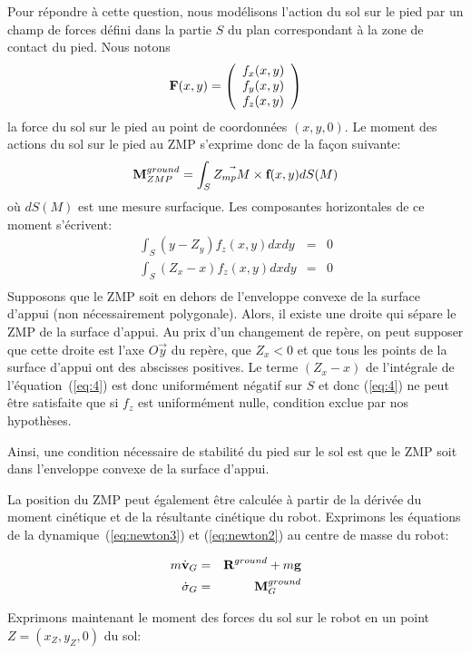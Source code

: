 Pour répondre à cette question, nous modélisons l'action du sol sur le
pied par un champ de forces défini dans la partie $S$ du plan
correspondant à la zone de contact du pied. Nous notons
$$
\textbf{F}(x,y) = \left(\begin{array}{c}
f_x(x,y) \\ f_y(x,y) \\ f_z(x,y)
\end{array}\right)
$$
la force du sol sur le pied au point de coordonnées $(x,y,0)$. Le
moment des actions du sol sur le pied au ZMP s'exprime donc de la
façon suivante:
\begin{eqnarray*}
\textbf{M}^{ground}_{ZMP} = \int_S \vec{Z_{mp}M} \times \textbf{f}(x,y) dS(M)
\end{eqnarray*}
où $dS(M)$ est une mesure surfacique.
Les composantes horizontales de ce moment s'écrivent:
\begin{eqnarray}\label{eq:3}
  \int_S (y-Z_y)f_z(x,y) dx dy &=& 0 \\
  \label{eq:4}
  \int_S (Z_x-x)f_z(x,y) dx dy &=& 0 \\
\end{eqnarray}
Supposons que le ZMP soit en dehors de l'enveloppe convexe de la
surface d'appui (non nécessairement polygonale). Alors, il existe une
droite qui sépare le ZMP de la surface d'appui. Au prix d'un
changement de repère, on peut supposer que cette droite est l'axe
$O\vec{y}$ du repère, que $Z_x < 0$ et que tous les points de la
surface d'appui ont des abscisses positives. Le terme $(Z_x-x)$ de
l'intégrale de l'équation (\ref{eq:4}) est donc uniformément négatif
sur $S$ et donc (\ref{eq:4}) ne peut être satisfaite que si $f_z$ est
uniformément nulle, condition exclue par nos hypothèses.

Ainsi, une condition nécessaire de stabilité du pied sur le sol est
que le ZMP soit dans l'enveloppe convexe de la surface d'appui.


La position du ZMP peut également être calculée à partir de la dérivée
du moment cinétique et de la résultante cinétique du robot.  Exprimons
les équations de la dynamique (\ref{eq:newton3}) et (\ref{eq:newton2})
au centre de masse du robot:

\begin{eqnarray*}
m\dot{\textbf{v}}_G &=& \textbf{R}^{ground} + m \textbf{g} \\
\dot{\sigma}_G &=& \textbf{M}_G^{ground}
\end{eqnarray*}

Exprimons maintenant le moment des forces du sol sur le robot en un
point $Z=(x_Z, y_Z, 0)$ du sol:

